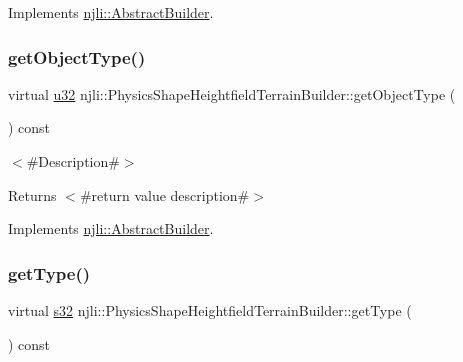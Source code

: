 Implements \mbox{\hyperlink{classnjli_1_1_abstract_builder_a902f73ea78031b06aca183a417f3413b}{njli\+::\+Abstract\+Builder}}.

\mbox{\label{classnjli_1_1_physics_shape_heightfield_terrain_builder_a8190b068102560bacebb79a4338e212a}} 
\subsubsection{\texorpdfstring{get\+Object\+Type()}{getObjectType()}}
{\footnotesize\ttfamily virtual \mbox{\hyperlink{_util_8h_a10e94b422ef0c20dcdec20d31a1f5049}{u32}} njli\+::\+Physics\+Shape\+Heightfield\+Terrain\+Builder\+::get\+Object\+Type (\begin{DoxyParamCaption}{ }\end{DoxyParamCaption}) const\hspace{0.3cm}{\ttfamily [virtual]}}

$<$\#\+Description\#$>$

\begin{DoxyReturn}{Returns}
$<$\#return value description\#$>$ 
\end{DoxyReturn}


Implements \mbox{\hyperlink{classnjli_1_1_abstract_builder_a0f2d344fcf697b167f4f2b1122b5fb33}{njli\+::\+Abstract\+Builder}}.

\mbox{\label{classnjli_1_1_physics_shape_heightfield_terrain_builder_a23e1dd10eae6896b1be6e76fdba275dc}} 
\subsubsection{\texorpdfstring{get\+Type()}{getType()}}
{\footnotesize\ttfamily virtual \mbox{\hyperlink{_util_8h_aa62c75d314a0d1f37f79c4b73b2292e2}{s32}} njli\+::\+Physics\+Shape\+Heightfield\+Terrain\+Builder\+::get\+Type (\begin{DoxyParamCaption}{ }\end{DoxyParamCaption}) const\hspace{0.3cm}{\ttfamily [virtual]}}

